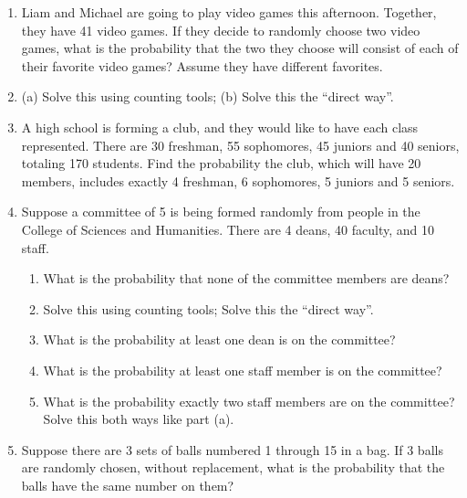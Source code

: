 \documentclass{article}
\begin{document}
\begin{enumerate}
   
    \item Liam and Michael are going to play video games this afternoon. Together, they have 41 video games. If they decide to randomly choose two video games, what is the probability that the two they choose will consist of each of their favorite video games? Assume they have different favorites.
    \item[] (a) Solve this using counting tools; \hspace{120pt} (b) Solve this the ``direct way''.\vspace{80pt}
    
    \item A high school is forming a club, and they would like to have each class represented. There are 30 freshman, 55 sophomores, 45 juniors and 40 seniors, totaling 170 students. Find the probability the club, which will have 20 members, includes exactly 4 freshman, 6 sophomores, 5 juniors and 5 seniors.\vspace{60pt}
                
    \item Suppose a committee of 5 is being formed randomly from people in the College of Sciences and Humanities. There are 4 deans, 40 faculty, and 10 staff. %
    \begin{enumerate}
        \item What is the probability that none of the committee members are deans?
        \item[] Solve this using counting tools; \hspace{120pt} Solve this the ``direct way''.\vspace{60pt}
        \item What is the probability at least one dean is on the committee?\vspace{30pt}
        \item What is the probability at least one staff member is on the committee?\vspace{60pt}
        \item What is the probability exactly two staff members are on the committee? Solve this both ways like part (a).\vspace{80pt}
    \end{enumerate}
    
    \item Suppose there are 3 sets of balls numbered 1 through 15 in a bag. If 3 balls are randomly chosen, without replacement, what is the probability that the balls have the same number on them?\vspace{60pt}%


\end{enumerate}
\end{document}
